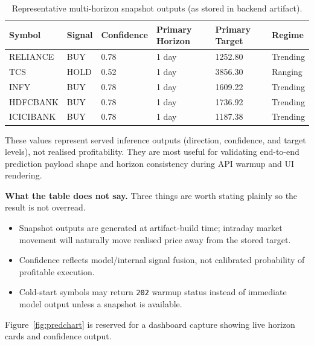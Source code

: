 \documentclass[12pt,a4paper]{report}
\numberwithin{equation}{chapter}
\begin{document}
\begin{table}[H]
\centering
\caption{Representative multi-horizon snapshot outputs (as stored in backend artifact).}
\label{tab:pred-results}
\small
\begin{tabular}{|p{2.4cm}|p{1.4cm}|p{1.6cm}|p{2.2cm}|p{2cm}|p{1.8cm}|}
\hline
\textbf{Symbol} & \textbf{Signal} & \textbf{Confidence} & \textbf{Primary Horizon} & \textbf{Primary Target} & \textbf{Regime} \\ \hline
RELIANCE    & BUY  & 0.78 & 1 day & 1252.80 & Trending \\ \hline
TCS         & HOLD & 0.52 & 1 day & 3856.30 & Ranging \\ \hline
INFY        & BUY  & 0.78 & 1 day & 1609.22 & Trending \\ \hline
HDFCBANK    & BUY  & 0.78 & 1 day & 1736.92 & Trending \\ \hline
ICICIBANK   & BUY  & 0.78 & 1 day & 1187.38 & Trending \\ \hline
\end{tabular}
\end{table}

These values represent served inference outputs (direction, confidence, and target levels), not realised profitability. They are most useful for validating end-to-end prediction payload shape and horizon consistency during API warmup and UI rendering.

\textbf{What the table does not say.} Three things are worth stating plainly so the result is not overread.

\begin{itemize}
  \item Snapshot outputs are generated at artifact-build time; intraday market movement will naturally move realised price away from the stored target.
  \item Confidence reflects model/internal signal fusion, not calibrated probability of profitable execution.
  \item Cold-start symbols may return \texttt{202} warmup status instead of immediate model output unless a snapshot is available.
\end{itemize}

Figure~\ref{fig:predchart} is reserved for a dashboard capture showing live horizon cards and confidence output.
\end{document}
